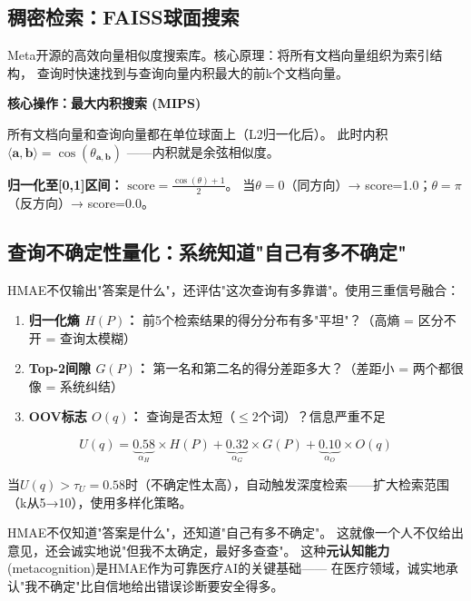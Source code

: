 \documentclass[11pt,a4paper]{ctexart}
\begin{document}
\subsection{稠密检索：FAISS球面搜索}

\begin{defbox}
Meta开源的高效向量相似度搜索库。核心原理：将所有文档向量组织为索引结构，
查询时快速找到与查询向量内积最大的前k个文档向量。
\end{defbox}

\textbf{核心操作：最大内积搜索 (MIPS)}

所有文档向量和查询向量都在单位球面上（L2归一化后）。
此时内积 $\langle \mathbf{a}, \mathbf{b} \rangle = \cos(\theta_{\mathbf{a},\mathbf{b}})$ ——内积就是余弦相似度。

\textbf{归一化至[0,1]区间：} $\text{score} = \frac{\cos(\theta) + 1}{2}$。
当$\theta=0$（同方向）→ score=1.0；$\theta=\pi$（反方向）→ score=0.0。

\subsection{查询不确定性量化：系统知道"自己有多不确定"}

HMAE不仅输出"答案是什么"，还评估"这次查询有多靠谱"。使用三重信号融合：

\begin{enumerate}[nosep]
\item \textbf{归一化熵 $H(P)$：} 前5个检索结果的得分分布有多"平坦"？（高熵 = 区分不开 = 查询太模糊）
\item \textbf{Top-2间隙 $G(P)$：} 第一名和第二名的得分差距多大？（差距小 = 两个都很像 = 系统纠结）
\item \textbf{OOV标志 $O(q)$：} 查询是否太短（$\leq 2$个词）？信息严重不足
\end{enumerate}

$$U(q) = \underbrace{0.58}_{\alpha_H} \times H(P) + \underbrace{0.32}_{\alpha_G} \times G(P) + \underbrace{0.10}_{\alpha_O} \times O(q)$$

当$U(q) > \tau_U = 0.58$时（不确定性太高），自动触发深度检索——扩大检索范围（k从5→10），使用多样化策略。

\begin{keybox}
HMAE不仅知道"答案是什么"，还知道"自己有多不确定"。
这就像一个人不仅给出意见，还会诚实地说"但我不太确定，最好多查查"。
这种\textbf{元认知能力}(metacognition)是HMAE作为可靠医疗AI的关键基础——
在医疗领域，诚实地承认"我不确定"比自信地给出错误诊断要安全得多。
\end{keybox}
\end{document}
